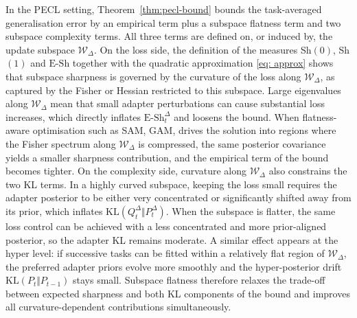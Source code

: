 \documentclass[10pt]{article} %
\begin{document}
In the PECL setting, Theorem~\ref{thm:pecl-bound} bounds the task-averaged generalisation error by an empirical term plus a subspace flatness term and two subspace complexity terms. All three terms are defined on, or induced by, the update subspace $\mathcal W_\Delta$.
On the loss side, the definition of the measures Sh$(0)$, Sh$(1)$ and $\mathrm{E\text{-}Sh}$ together with the quadratic approximation \eqref{eq: approx} shows that subspace sharpness is governed by the curvature of the loss along $\mathcal W_\Delta$, as captured by the Fisher or Hessian restricted to this subspace.
Large eigenvalues along $\mathcal W_\Delta$ mean that small adapter perturbations can cause substantial loss increases, which directly inflates $\mathrm{E\text{-}Sh}^{\Delta}_t$ and loosens the bound. When flatness-aware optimisation such as SAM, GAM, drives the solution into regions where the Fisher spectrum along $\mathcal W_\Delta$ is compressed, the same posterior covariance yields a smaller sharpness contribution, and the empirical term of the bound becomes tighter.
On the complexity side, curvature along $\mathcal W_\Delta$ also constrains the two KL terms. In a highly curved subspace, keeping the loss small requires the adapter posterior to be either very concentrated or significantly shifted away from its prior, which inflates $\mathrm{KL}(Q^\Delta_t \Vert P^\Delta_t)$. When the subspace is flatter, the same loss control can be achieved with a less concentrated and more prior-aligned posterior, so the adapter KL remains moderate. A similar effect appears at the hyper level: if successive tasks can be fitted within a relatively flat region of $\mathcal W_\Delta$, the preferred adapter priors evolve more smoothly and the hyper-posterior drift $\mathrm{KL}(P_t \Vert P_{t-1})$ stays small. Subspace flatness therefore relaxes the trade-off between expected sharpness and both KL components of the bound and improves all curvature-dependent contributions simultaneously.
\end{document}
